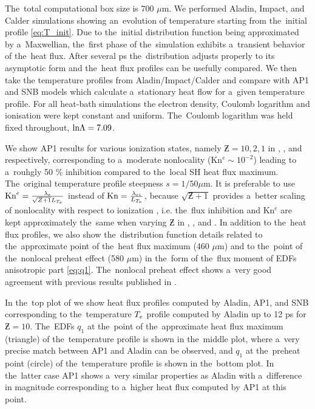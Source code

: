 The~total computational box size is 700 $\mu$m.
We performed Aladin, Impact, and Calder simulations showing an~evolution of
temperature starting from the~initial profile \eqref{eq:T_init}. 
Due to the~initial distribution function being approximated by a~Maxwellian,
the~first phase of the~simulation exhibits a~transient behavior of the~heat
flux. After several ps the~distribution adjusts properly to its asymptotic form
and the~heat flux profiles can be usefully compared. 
We then take the temperature profiles from Aladin/Impact/Calder and compare 
with AP1 and SNB models which calculate a~stationary heat flow
for a~given temperature profile. 
For all heat-bath simulations the electron density, Coulomb logarithm and 
ionisation were kept constant and uniform.
The~Coulomb logarithm was held fixed throughout, $\text{ln}\Lambda = 7.09$.

We show AP1 results for various ionization states, namely $\Zbar= 10, 2, 1$ 
in , , 
and  respectively, corresponding to 
a~moderate nonlocality 
(Kn$^e \sim 10^{-2}$) leading to a~rouhgly 50 $\%$ inhibition compared 
to the~local SH heat flux maximum. The~original temperature profile steepness
$s = 1/50 \mu$m.
It is preferable to use 
$\text{Kn}^e = \frac{\lambda_e}{\sqrt{Z + 1}L_{T_e}}$ instead of
 $\text{Kn} = \frac{\lambda_{ei}}{L_{T_e}}$, because $\sqrt{\Zbar + 1}$ provides 
a~better scaling of nonlocality with respect
to ionization \cite{LMV_1983_7}, i.e. the~flux inhibition and Kn$^e$ are
kept approximately the~same when varying $\Zbar$ in 
, , 
and .
In addition to the~heat flux profiles, we also show the~distribution function 
details related to the~approximate point of the~heat flux maximum (460 $\mu$m) 
and to the~point of the~nonlocal preheat effect (580 $\mu$m) in the~form of
the~flux moment of EDFs anisotropic part \eqref{eq:q1}.
The~nonlocal preheat effect shows a~very good agreement with 
previous results published in \cite{Sherlock_PoP2017}.

In the~top plot of  we show heat flux profiles
computed by Aladin, AP1, and SNB corresponding to the~temperature $T_e$ profile 
computed by Aladin up to 12 ps for $\Zbar = 10$. 
The~EDFs $q_1$ at the~point of the~approximate heat flux maximum (triangle) of
the~temperature profile is shown in the~middle plot, where a~very precise match
between AP1 and Aladin can be observed, and $q_1$ at the~preheat point (circle)
of the~temperature profile is shown in the~bottom plot. In the~latter case
AP1 shows a~very similar properties as Aladin with a~difference in magnitude
corresponding to a~higher heat flux computed by AP1 at this point. 


